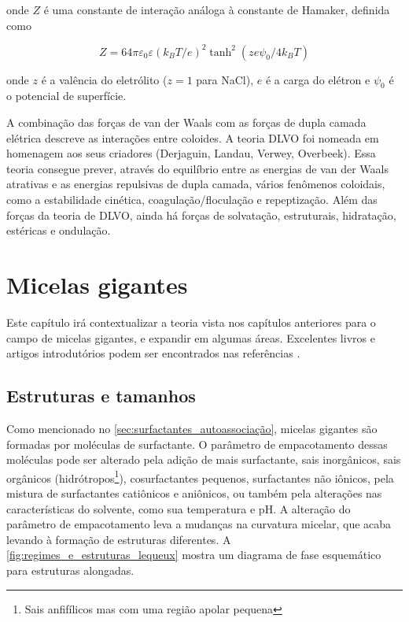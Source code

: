 	\noindent onde \(Z\) é uma constante de interação análoga à constante de Hamaker, definida como 
	
	\begin{equation}
		Z = 64 \pi \varepsilon _ { 0 } \varepsilon ( k_B T / e ) ^ { 2 } \tanh ^ { 2 } \left( z e \psi _ { 0 } / 4 k_B T \right)
		\label{eqn:constante_interacao_Z}
	\end{equation} 
	
	\noindent onde \(z\) é a valência do eletrólito (\(z=1\) para NaCl), \(e\) é a carga do elétron e \(\psi_0\) é o potencial de superfície.
	
	A combinação das forças de van der Waals com as forças de dupla camada elétrica descreve as interações entre coloides. A teoria DLVO foi nomeada em homenagem aos seus criadores (Derjaguin, Landau, Verwey, Overbeek). Essa teoria consegue prever, através do equilíbrio entre as energias de van der Waals atrativas e as energias repulsivas de dupla camada, vários fenômenos coloidais, como a estabilidade cinética, coagulação/floculação e repeptização. Além das forças da teoria de DLVO, ainda há forças de solvatação, estruturais, hidratação, estéricas e ondulação. 
	

	\chapter{Micelas gigantes} 
	Este capítulo irá contextualizar a teoria vista nos capítulos anteriores para o campo de micelas gigantes, e expandir em algumas áreas. Excelentes livros e artigos introdutórios podem ser encontrados nas referências \cite{Dreiss2007, Giant_Micelles, WLM_Advances, Herb1994, Ezrahi2006}.

		\label{chap:micelas_gigantes}
		\section{Estruturas e tamanhos}  %
		Como mencionado no \autoref{sec:surfactantes_autoassociação}, micelas gigantes são formadas por moléculas de surfactante. O parâmetro de empacotamento dessas moléculas pode ser alterado pela adição de mais surfactante, sais inorgânicos, sais orgânicos (hidrótropos\footnote{Sais anfifílicos mas com uma região apolar pequena}), cosurfactantes pequenos, surfactantes não iônicos, pela mistura de surfactantes catiônicos e aniônicos, ou também pela alterações nas características do solvente, como sua temperatura e pH.\cite{Dreiss2007} A alteração do parâmetro de empacotamento leva a mudanças na curvatura micelar, que acaba levando à formação de estruturas diferentes. A \autoref{fig:regimes_e_estruturas_lequeux} mostra um diagrama de fase esquemático para estruturas alongadas.
		
